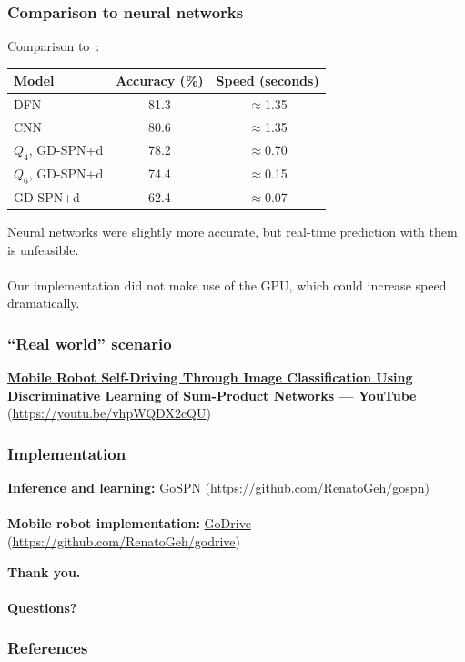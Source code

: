 \documentclass{beamer}
\begin{document}
\begin{frame}
  \frametitle{Comparison to neural networks}

  Comparison to~\cite{moraes18}:

  \begin{table}
    \centering
    \begin{tabular}{l|c|c}
      \textbf{Model} & \textbf{Accuracy (\%)} & \textbf{Speed (seconds)}\\
      \hline
      DFN & 81.3 & $\approx$1.35\\
      CNN & 80.6 & $\approx$1.35\\
      \hline
      $Q_4$, GD-SPN+d & 78.2 & $\approx$0.70\\
      $Q_6$, GD-SPN+d & 74.4 & $\approx$0.15\\
      GD-SPN+d & 62.4 & $\approx$0.07
    \end{tabular}
  \end{table}

  Neural networks were slightly more accurate, but real-time prediction with them is
  unfeasible.\\~\\

  Our implementation did not make use of the GPU, which could increase speed dramatically.

\end{frame}

\begin{frame}
  \frametitle{``Real world'' scenario}

  \footnotesize\centering\textbf{\href{https://youtu.be/vhpWQDX2cQU}{Mobile Robot Self-Driving Through Image Classification Using
  Discriminative Learning of Sum-Product Networks --- YouTube}}
  (\url{https://youtu.be/vhpWQDX2cQU})
\end{frame}

\begin{frame}
  \frametitle{Implementation}
  \centering
  \large\textbf{Inference and learning:} \href{https://github.com/RenatoGeh/gospn}{GoSPN}
  (\url{https://github.com/RenatoGeh/gospn})\\~\\

  \textbf{Mobile robot implementation:} \href{https://github.com/RenatoGeh/godrive}{GoDrive}
  (\url{https://github.com/RenatoGeh/godrive})

\end{frame}

\begin{frame}
  \begin{center}
    \textbf{Thank you.\\~\\Questions?}
  \end{center}
\end{frame}

\begin{frame}[t,allowframebreaks]
  \frametitle{References}
  \printbibliography[heading=none]
  \nocite{*}
\end{frame}
\end{document}

